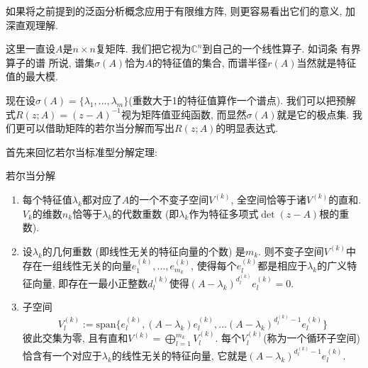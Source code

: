 

如果将之前提到的泛函分析概念应用于有限维方阵, 则更容易看出它们的意义, 加深直观理解. 

这里一直设$A$是$n\times n$复矩阵. 我们把它视为$\mathbb{C}^n$到自己的一个线性算子. 如词条 有界算子的谱 所说, 谱集$\sigma(A)$恰为$A$的特征值的集合, 而谱半径$r(A)$当然就是特征值的最大模. 

现在设$\sigma(A)=\{\lambda_1,...,\lambda_m\}$(重数大于1的特征值算作一个谱点). 我们可以把预解式$R(z;A)=(z-A)^{-1}$视为矩阵值亚纯函数, 而显然$\sigma(A)$就是它的极点集. 我们更可以借助矩阵的若尔当分解而写出$R(z;A)$的明显表达式. 

首先来回忆若尔当标准型分解定理:

\begin{theorem}{若尔当分解}
\begin{enumerate}
\item 每个特征值$\lambda_k$都对应了$A$的一个不变子空间$V^{(k)}$, 全空间恰等于诸$V^{(k)}$的直和. $V_k$的维数$n_k$恰等于$\lambda_k$的代数重数 (即$\lambda_k$作为特征多项式$\det(z-A)$根的重数).
\item 设$\lambda_k$的几何重数 (即线性无关的特征向量的个数) 是$m_k$. 则不变子空间$V^{(k)}$中存在一组线性无关的向量$e^{(k)}_1,...,e^{(k)}_{m_k}$, 使得每个$e^{(k)}_l$都是相应于$\lambda_k$的广义特征向量, 即存在一最小正整数$d^{(k)}_l$使得$(A-\lambda_k)^{d^{(k)}_l}e^{(k)}_l=0$.
\item 子空间
$$
V^{(k)}_l:=\text{span}\{e^{(k)}_l,(A-\lambda_k)e^{(k)}_l,...(A-\lambda_k)^{d^{(k)}_l-1}e^{(k)}_l\}
$$
彼此交集为零, 且有直和$V^{(k)}=\bigoplus_{l=1}^{m_k}V^{(k)}_l$. 每个$V^{(k)}_l$(称为一个循环子空间) 恰含有一个对应于$\lambda_k$的线性无关的特征向量, 它就是$(A-\lambda_k)^{d^{(k)}_l-1}e^{(k)}_l$.
\end{enumerate}
\end{theorem}
